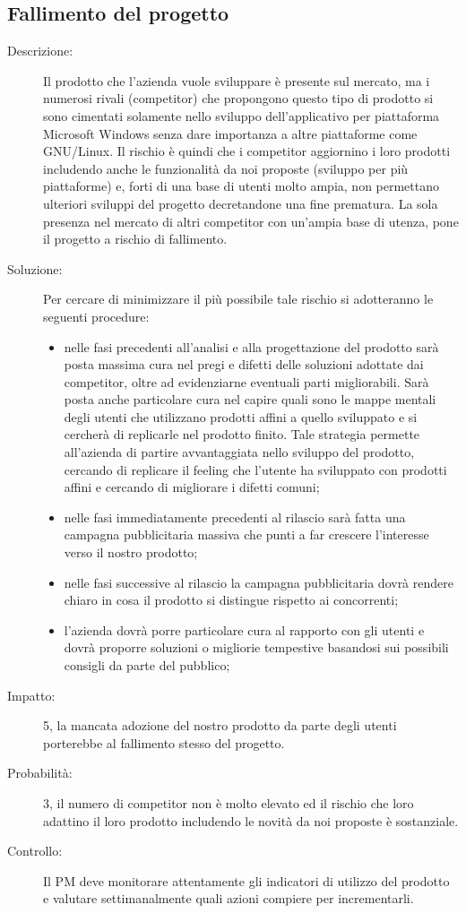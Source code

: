 \subsection{Fallimento del progetto}
\begin{description}
\item[Descrizione:] Il prodotto che l'azienda vuole sviluppare è presente sul mercato, ma i numerosi rivali (competitor) che propongono questo tipo di prodotto si sono cimentati solamente nello sviluppo dell'applicativo per piattaforma Microsoft Windows senza dare importanza a altre piattaforme come GNU/Linux.
Il rischio è quindi che i competitor aggiornino i loro prodotti includendo anche le
funzionalità da noi proposte (sviluppo per più piattaforme) e, forti di una base di utenti molto ampia, non permettano ulteriori sviluppi del progetto decretandone una fine prematura. La sola presenza nel mercato di altri competitor con un'ampia base di utenza, pone il progetto a rischio di fallimento.
\item[Soluzione:] Per cercare di minimizzare il più possibile tale rischio si adotteranno le
seguenti procedure:
	\begin{itemize}
	\item nelle fasi precedenti all'analisi e alla progettazione del prodotto sarà posta
	massima cura nel pregi e difetti delle soluzioni adottate dai competitor, oltre ad evidenziarne eventuali parti
	migliorabili. Sarà posta anche particolare cura nel capire quali sono le mappe mentali degli utenti che utilizzano prodotti affini a quello sviluppato e si cercherà di replicarle nel prodotto finito. Tale strategia permette all'azienda di partire avvantaggiata nello sviluppo del prodotto, cercando di replicare il feeling che l'utente ha sviluppato con prodotti affini e cercando di migliorare i difetti comuni;
	\item nelle fasi immediatamente precedenti al rilascio sarà fatta una campagna
	pubblicitaria massiva che punti a far crescere l'interesse verso il nostro prodotto;
	\item nelle fasi successive al rilascio la campagna pubblicitaria dovrà rendere chiaro
	in cosa il prodotto si distingue rispetto ai concorrenti;
	\item l'azienda dovrà porre particolare cura al rapporto con gli utenti e dovrà
	proporre soluzioni o migliorie tempestive basandosi sui possibili consigli da parte del pubblico;
	\end{itemize}
\item[Impatto:] 5, la mancata adozione del nostro prodotto da parte degli utenti porterebbe
al fallimento stesso del progetto.
\item[Probabilità:] 3, il numero di competitor non è molto elevato ed il rischio che loro adattino
il loro prodotto includendo le novità da noi proposte è sostanziale. 
\item[Controllo:] Il PM deve monitorare attentamente gli indicatori di utilizzo del prodotto
e valutare settimanalmente quali azioni compiere per incrementarli.
\end{description}

